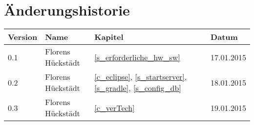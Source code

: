 %
%

\noindent
\chapter*{Änderungshistorie}
\begin{tabularx}{\textwidth}{|l|X|l|l|} \hline
       \textbf{Version}  	& \textbf{Name}   	& \textbf{Kapitel}  						& \textbf{Datum}\\ \hline
       0.1           		& Florens Hückstädt & \ref{s_erforderliche_hw_sw} 				& 17.01.2015\\\hline
       0.2           		& Florens Hückstädt & \ref{c_eclipse}, \ref{s_startserver}, \ref{s_gradle}, \ref{s_config_db} 		& 18.01.2015\\\hline
       0.3           		& Florens Hückstädt & \ref{c_verTech} 				& 19.01.2015\\
        \hline
\end{tabularx}

